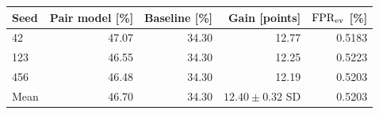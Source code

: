 \begin{tabular}{@{}lrrrr@{}}
\toprule
Seed & Pair model [\%] & Baseline [\%] & Gain [points] & $\mathrm{FPR}_{\mathrm{ev}}$ [\%] \\
\midrule
42  & 47.07 & 34.30 & 12.77 & 0.5183 \\
123 & 46.55 & 34.30 & 12.25 & 0.5223 \\
456 & 46.48 & 34.30 & 12.19 & 0.5203 \\
\midrule
Mean & 46.70 & 34.30 & $12.40\pm0.32$ SD & 0.5203 \\
\bottomrule
\end{tabular}
